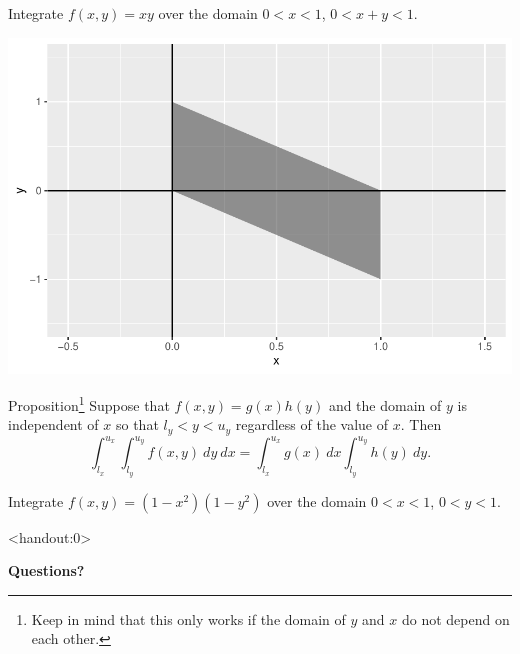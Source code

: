  


\begin{frame}
  \begin{block}{\example}
    Integrate $f(x,y)=xy$ over the domain $0 < x < 1$, $0 < x + y < 1$.
  \end{block}
 
 \pause
 
 \begin{center}
    \includegraphics[height = .5\textheight]{figure/example3-1}
    \end{center}
\end{frame}

\begin{frame}

  \begin{block}{Proposition\footnote{Keep in mind that this only works if the domain of $y$ and $x$ do not depend on each other.}}
    Suppose that $f(x,y)=g(x)h(y)$ and the domain of $y$ is independent of $x$ so that $l_y < y < u_y$ regardless of the value of $x$. Then 
\[
  \int_{l_x}^{u_x} \int_{l_y}^{u_y} f(x,y) ~dy ~dx= \int_{l_x}^{u_x} g(x) ~dx \int_{l_y}^{u_y} h(y) ~dy.
\]

  \end{block}
\end{frame}

\begin{frame}
  \begin{block}{\example}
    Integrate $f(x,y)=(1-x^2)(1-y^2)$ over the domain $0<x<1$, $0<y<1$.
  \end{block}
\end{frame}

\begin{frame}<handout:0>
  \begin{center}
    \Huge{\textbf{Questions?}}
  \end{center}
\end{frame}

